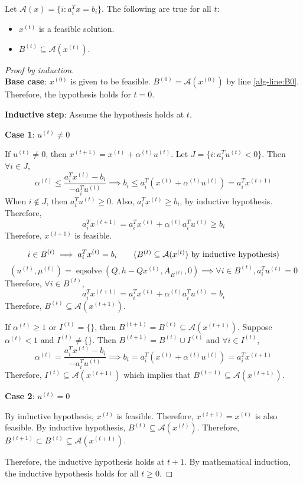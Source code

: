 \begin{lemma}[Invariants]
\label{thm:invariants}
Let $\mathcal{A}(x) = \{i: a_i^Tx = b_i\}$.
The following are true for all $t$:
\begin{itemize}
\item $x^{(t)}$ is a feasible solution.
\item $B^{(t)} \subseteq \mathcal{A}(x^{(t)})$.
\end{itemize}
\end{lemma}
\begin{proof}[Proof by induction]
\leavevmode \\
\textbf{Base case}: $x^{(0)}$ is given to be feasible.
$B^{(0)} = \mathcal{A}(x^{(0)})$ by line \ref{alg-line:B0}.
Therefore, the hypothesis holds for $t=0$.

\textbf{Inductive step}:
Assume the hypothesis holds at $t$.

\textbf{Case 1}: $u^{(t)} \neq 0$

If $u^{(t)} \neq 0$, then $x^{(t+1)} = x^{(t)} + \alpha^{(t)}u^{(t)}$.
Let $J = \{i: a_i^Tu^{(t)} < 0\}$. Then $\forall i \in J$,
\[ \alpha^{(t)} \le \frac{a_i^Tx^{(t)}-b_i}{-a_i^Tu^{(t)}}
\implies b_i \le a_i^T(x^{(t)} + \alpha^{(t)}u^{(t)}) = a_i^Tx^{(t+1)} \]
When $i \not\in J$, then $a_i^Tu^{(t)} \ge 0$.
Also, $a_i^Tx^{(t)} \ge b_i$, by inductive hypothesis.
Therefore,
\[ a_i^Tx^{(t+1)} = a_i^Tx^{(t)} + \alpha^{(t)}a_i^Tu^{(t)} \ge b_i \]
Therefore, $x^{(t+1)}$ is feasible.

\[ i \in B^{(t)} \implies a_i^Tx^{(t)} = b_i
\tag{$B^{(t)} \subseteq \mathcal{A}(x^{(t)})$ by inductive hypothesis} \]
\[ (u^{(t)}, \mu^{(t)}) = \operatorname{eqsolve}(Q, h - Qx^{(t)}, A_{B^{(t)}}, 0)
\implies \forall i \in B^{(t)}, a_i^Tu^{(t)} = 0 \]
Therefore, $\forall i \in B^{(t)}$,
\[ a_i^Tx^{(t+1)} = a_i^Tx^{(t)} + \alpha^{(t)}a_i^Tu^{(t)} = b_i \]
Therefore, $B^{(t)} \subseteq \mathcal{A}(x^{(t+1)})$.

If $\alpha^{(t)} \ge 1$ or $I^{(t)} = \{\}$, then $B^{(t+1)} = B^{(t)} \subseteq \mathcal{A}(x^{(t+1)})$.
Suppose $\alpha^{(t)} < 1$ and $I^{(t)} \neq \{\}$.
Then $B^{(t+1)} = B^{(t)} \cup I^{(t)}$ and $\forall i \in I^{(t)}$,
\[ \alpha^{(t)} = \frac{a_i^Tx^{(t)} - b_i}{-a_i^Tu^{(t)}}
\implies b_i = a_i^T(x^{(t)} + \alpha^{(t)}u^{(t)}) = a_i^Tx^{(t+1)} \]
Therefore, $I^{(t)} \subseteq \mathcal{A}(x^{(t+1)})$
which implies that $B^{(t+1)} \subseteq \mathcal{A}(x^{(t+1)})$.

\textbf{Case 2}: $u^{(t)} = 0$

By inductive hypothesis, $x^{(t)}$ is feasible.
Therefore, $x^{(t+1)} = x^{(t)}$ is also feasible.
By inductive hypothesis, $B^{(t)} \subseteq \mathcal{A}(x^{(t)})$.
Therefore, $B^{(t+1)} \subset B^{(t)} \subseteq \mathcal{A}(x^{(t+1)})$.

Therefore, the inductive hypothesis holds at $t+1$.
By mathematical induction, the inductive hypothesis holds for all $t \ge 0$.
\end{proof}


